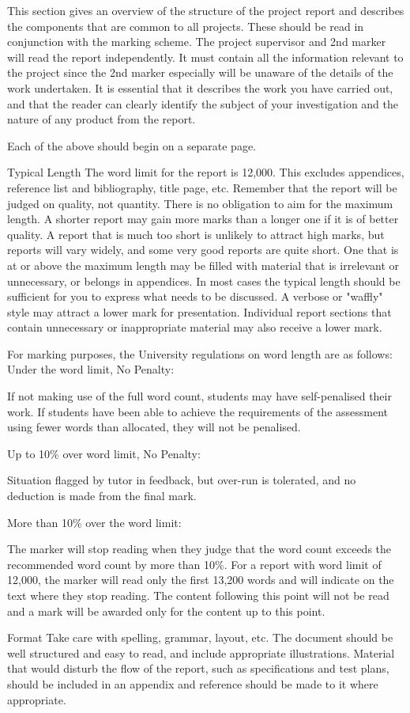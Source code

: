 \documentclass[11pt, twoside, a4paper]{report}
\newcommand{\todoinline}[1]{
    \begin{sloppypar}
        \colorlet{todo old}{.}
        \color{red}
        #1
        \color{todo old}
        \todo{See inline comment}
    \end{sloppypar}
}
\begin{document}

\todoinline{
    This section gives an overview of the structure of the project report and describes the components that are common to all projects. These should be read in conjunction
    with the marking scheme.
    The project supervisor and 2nd marker will read the report independently. It must contain all the information relevant to the project since the 2nd marker especially
    will be unaware of the details of the work undertaken. It is essential that it describes the work you have carried out, and that the reader can clearly identify the
    subject of your investigation and the nature of any product from the report.

    Each of the above should begin on a separate page.

    Typical Length
    The word limit for the report is 12,000. This excludes appendices, reference list and bibliography, title page, etc.
    Remember that the report will be judged on quality, not quantity. There is no obligation to aim for the maximum length. A shorter report may gain more marks than a
    longer one if it is of better quality.
    A report that is much too short is unlikely to attract high marks, but reports will vary widely, and some very good reports are quite short. One that is at or above
    the maximum length may be filled with material that is irrelevant or unnecessary,
    or belongs in appendices. In most cases the typical length should be sufficient for you to express what needs to be discussed. A verbose or "waffly" style may attract
    a lower mark for presentation. Individual report sections that contain unnecessary or inappropriate material may also receive a lower mark.

    For marking purposes, the University regulations on word length are as follows:
    Under the word limit, No Penalty:

    If not making use of the full word count, students may have self-penalised their work. If students have been able to achieve the requirements of the assessment
    using fewer words than allocated, they will not be penalised.

    Up to 10\% over word limit, No Penalty:

    Situation flagged by tutor in feedback, but over-run is tolerated, and no deduction is made from the final mark.

    More than 10\% over the word limit:

    The marker will stop reading when they judge that the word count exceeds the recommended word count by more than 10\%. For a report with word limit of 12,000,
    the marker will read only the first 13,200 words and will indicate on the text where they stop reading. The content following this point will not be read and
    a mark will be awarded only for the content up to this point.


    Format
    Take care with spelling, grammar, layout, etc. The document should be well structured and easy to read,
    and include appropriate illustrations. Material that would disturb the flow of the report,
    such as specifications and test plans, should be included in an appendix and reference should be made to it where appropriate.
}
\end{document}
